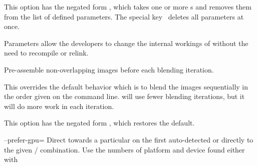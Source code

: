 \begin{codelist}
  This option has the negated form %
  , which takes one or more s and removes them from the list
  of defined parameters.  The special key~\sample{*} deletes all parameters at once.

  Parameters allow the developers to change the internal workings of \App{} without the need to
  recompile or relink.

\begin{sgquote}

\end{sgquote}


\ifenblend
    \label{opt:pre-assemble}%
  \item[\itempar{-a \\ --pre-assemble}]\itemend
    Pre-assemble non-overlapping images before each blending iteration.

    This overrides the default behavior which is to blend the images sequentially in the order
    given on the command line.  \App{} will use fewer blending iterations, but it will do more
    work in each iteration.

    This option has the negated form %
    , which restores the default.
\fi


  \label{opt:prefer-gpu}%
\item[--prefer-gpu=\optional{\metavar{PLATFORM}:}\metavar{DEVICE}
  \restrictednote{\acronym{OpenCL}-enabled versions only.}]\itemend
  Direct \App{} towards a particular   on the first
  auto-detected  or directly to the given \slash{} combination.  Use the numbers of platform and
  device found either with


\end{codelist}
